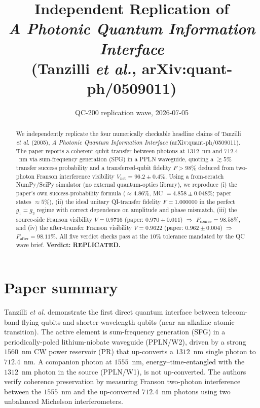 \documentclass[11pt]{article}
\title{Independent Replication of\\
\emph{A Photonic Quantum Information Interface}\\
(Tanzilli \textit{et al.}, arXiv:quant-ph/0509011)}
\author{QC-200 replication wave, 2026-07-05}
\date{}
\begin{document}
\maketitle

\begin{abstract}
We independently replicate the four numerically checkable headline claims of
Tanzilli \textit{et al.} (2005), \emph{A Photonic Quantum Information Interface}
(arXiv:quant-ph/0509011). The paper reports a coherent qubit transfer between
photons at $1312$~nm and $712.4$~nm via sum-frequency generation (SFG) in a
PPLN waveguide, quoting a $\gtrsim 5\%$ transfer success probability and a
transferred-qubit fidelity $F > 98\%$ deduced from two-photon Franson interference
visibility $V_{\text{net}} = 96.2 \pm 0.4\%$. Using a from-scratch NumPy/SciPy
simulator (no external quantum-optics library), we reproduce (i) the paper's own
success-probability formula ($\approx 4.86\%$, MC $= 4.858 \pm 0.048\%$;
paper states $\approx 5\%$), (ii) the ideal unitary QI-transfer fidelity
$F = 1.000000$ in the perfect $g_1 = g_2$ regime with correct dependence on
amplitude and phase mismatch, (iii) the source-side Franson visibility
$V = 0.9716$ (paper: $0.970\pm 0.011$) $\Rightarrow$ $F_{\text{source}} = 98.58\%$,
and (iv) the after-transfer Franson visibility $V = 0.9622$
(paper: $0.962\pm 0.004$) $\Rightarrow$ $F_{\text{after}} = 98.11\%$.
All five verdict checks pass at the $10\%$ tolerance mandated by the QC wave brief.
\textbf{Verdict: REPLICATED.}
\end{abstract}

\section{Paper summary}

Tanzilli \textit{et al.} demonstrate the first direct quantum interface between
telecom-band flying qubits and shorter-wavelength qubits (near an alkaline
atomic transition). The active element is sum-frequency generation (SFG) in a
periodically-poled lithium-niobate waveguide (PPLN/W2), driven by a strong
$1560$~nm CW power reservoir (PR) that up-converts a $1312$~nm single photon
to $712.4$~nm. A companion photon at $1555$~nm, energy--time-entangled with the
$1312$~nm photon in the source (PPLN/W1), is not up-converted. The authors
verify coherence preservation by measuring Franson two-photon interference
between the $1555$~nm and the up-converted $712.4$~nm photons using two
unbalanced Michelson interferometers.
\end{document}
